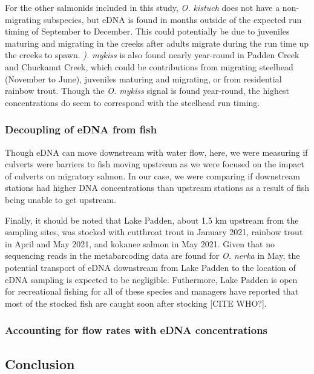 \documentclass[
]{article}
\begin{document}
For the other salmonids included in this study, \emph{O. kistuch} does
not have a non-migrating subspecies, but eDNA is found in months outside
of the expected run timing of September to December. This could
potentially be due to juveniles maturing and migrating in the creeks
after adults migrate during the run time up the creeks to spawn.
\emph{). mykiss} is also found nearly year-round in Padden Creek and
Chuckanut Creek, which could be contributions from migrating steelhead
(November to June), juveniles maturing and migrating, or from
residential rainbow trout. Though the \emph{O. mykiss} signal is found
year-round, the highest concentrations do seem to correspond with the
steelhead run timing.

\hypertarget{decoupling-of-edna-from-fish}{%
\subsubsection{Decoupling of eDNA from
fish}\label{decoupling-of-edna-from-fish}}

Though eDNA can move downstream with water flow, here, we were measuring
if culverts were barriers to fish moving upstream as we were focused on
the impact of culverts on migratory salmon. In our case, we were
comparing if downstream stations had higher DNA concentrations than
upstream stations as a result of fish being unable to get upstream.

Finally, it should be noted that Lake Padden, about 1.5 km upstream from
the sampling sites, was stocked with cutthroat trout in January 2021,
rainbow trout in April and May 2021, and kokanee salmon in May 2021.
Given that no sequencing reads in the metabarcoding data are found for
\emph{O. nerka} in May, the potential transport of eDNA downstream from
Lake Padden to the location of eDNA sampling is expected to be
negligible. Futhermore, Lake Padden is open for recreational fishing for
all of these species and managers have reported that most of the stocked
fish are caught soon after stocking {[}CITE WHO?{]}.

\hypertarget{accounting-for-flow-rates-with-edna-concentrations}{%
\subsubsection{Accounting for flow rates with eDNA
concentrations}\label{accounting-for-flow-rates-with-edna-concentrations}}

\hypertarget{conclusion}{%
\subsection{Conclusion}\label{conclusion}}
\end{document}

